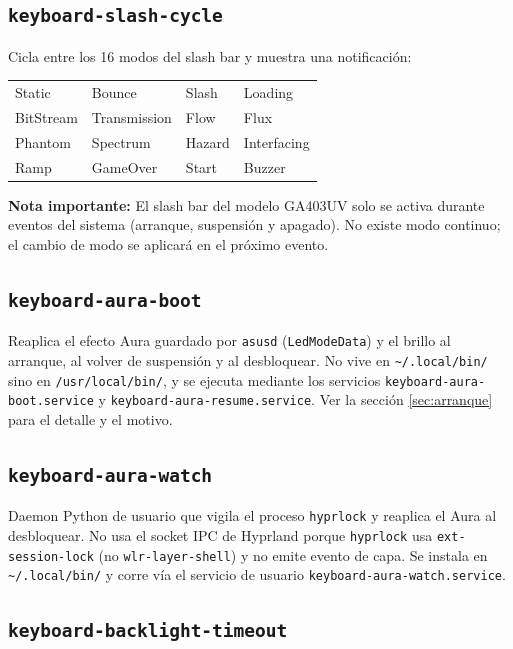 \documentclass[12pt,a4paper]{article}
\begin{document}
\subsection{\texttt{keyboard-slash-cycle}}

Cicla entre los 16 modos del slash bar y muestra una notificación:

\begin{center}
\begin{tabular}{llll}
  \toprule
  Static & Bounce & Slash & Loading \\
  BitStream & Transmission & Flow & Flux \\
  Phantom & Spectrum & Hazard & Interfacing \\
  Ramp & GameOver & Start & Buzzer \\
  \bottomrule
\end{tabular}
\end{center}

\textbf{Nota importante:} El slash bar del modelo GA403UV solo se activa
durante eventos del sistema (arranque, suspensión y apagado). No existe modo
continuo; el cambio de modo se aplicará en el próximo evento.

\subsection{\texttt{keyboard-aura-boot}}

Reaplica el efecto Aura guardado por \texttt{asusd} (\texttt{LedModeData}) y el
brillo al arranque, al volver de suspensión y al desbloquear. No vive en
\texttt{\textasciitilde/.local/bin/} sino en \texttt{/usr/local/bin/}, y se
ejecuta mediante los servicios \texttt{keyboard-aura-boot.service} y
\texttt{keyboard-aura-resume.service}. Ver la sección \ref{sec:arranque} para el
detalle y el motivo.

\subsection{\texttt{keyboard-aura-watch}}

Daemon Python de usuario que vigila el proceso \texttt{hyprlock} y reaplica el
Aura al desbloquear. No usa el socket IPC de Hyprland porque \texttt{hyprlock}
usa \texttt{ext-session-lock} (no \texttt{wlr-layer-shell}) y no emite evento
de capa. Se instala en \texttt{\textasciitilde/.local/bin/} y corre vía el
servicio de usuario \texttt{keyboard-aura-watch.service}.

\subsection{\texttt{keyboard-backlight-timeout}}
\end{document}

